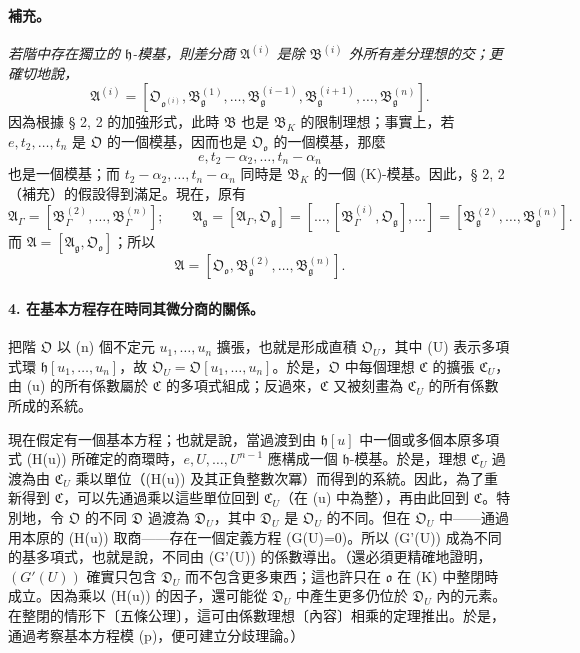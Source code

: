 \documentclass[11pt]{article}
\begin{document}
\paragraph{補充。}
\emph{若階中存在獨立的 \(\mathfrak h\)-模基，則差分商 \(\mathfrak A^{(i)}\) 是除 \(\mathfrak B^{(i)}\) 外所有差分理想的交；更確切地說，}
\[
\mathfrak A^{(i)}=
[\mathfrak O_{\mathfrak o^{(i)}},
\mathfrak B_{\mathfrak g}^{(1)},\ldots,
\mathfrak B_{\mathfrak g}^{(i-1)},
\mathfrak B_{\mathfrak g}^{(i+1)},\ldots,
\mathfrak B_{\mathfrak g}^{(n)}].
\]
因為根據 § 2, 2 的加強形式，此時 \(\mathfrak B\) 也是 \(\mathfrak B_K\) 的限制理想；事實上，若 \(e,t_2,\ldots,t_n\) 是 \(\mathfrak O\) 的一個模基，因而也是 \(\mathfrak O_{\mathfrak o}\) 的一個模基，那麼
\[
e,t_2-\alpha_2,\ldots,t_n-\alpha_n
\]
也是一個模基；而 \(t_2-\alpha_2,\ldots,t_n-\alpha_n\) 同時是 \(\mathfrak B_K\) 的一個 (K)-模基。因此，§ 2, 2（補充）的假設得到滿足。現在，原有
\[
\mathfrak A_\Gamma=[\mathfrak B_\Gamma^{(2)},\ldots,\mathfrak B_\Gamma^{(n)}];
\qquad
\mathfrak A_\mathfrak g=[\mathfrak A_\Gamma,\mathfrak O_\mathfrak g]
=[\ldots,[\mathfrak B_\Gamma^{(i)},\mathfrak O_\mathfrak g],\ldots]
=[\mathfrak B_\mathfrak g^{(2)},\ldots,\mathfrak B_\mathfrak g^{(n)}].
\]
而 \(\mathfrak A=[\mathfrak A_\mathfrak g,\mathfrak O_{\mathfrak o}]\)；所以
\[
\mathfrak A=[\mathfrak O_{\mathfrak o},\mathfrak B_\mathfrak g^{(2)},\ldots,\mathfrak B_\mathfrak g^{(n)}].
\]

\paragraph{4. 在基本方程存在時同其微分商的關係。}
把階 \(\mathfrak O\) 以 (n) 個不定元 \(u_1,\ldots,u_n\) 擴張，也就是形成直積 \(\mathfrak O_U\)，其中 (U) 表示多項式環 \(\mathfrak h[u_1,\ldots,u_n]\)，故 \(\mathfrak O_U=\mathfrak O[u_1,\ldots,u_n]\)。於是，\(\mathfrak O\) 中每個理想 \(\mathfrak C\) 的擴張 \(\mathfrak C_U\)，由 (u) 的所有係數屬於 \(\mathfrak C\) 的多項式組成；反過來，\(\mathfrak C\) 又被刻畫為 \(\mathfrak C_U\) 的所有係數所成的系統。

現在假定有一個基本方程；也就是說，當過渡到由 \(\mathfrak h[u]\) 中一個或多個本原多項式 (H(u)) 所確定的商環時，\(e,U,\ldots,U^{n-1}\) 應構成一個 \(\mathfrak h\)-模基。於是，理想 \(\mathfrak C_U\) 過渡為由 \(\mathfrak C_U\) 乘以單位（(H(u)) 及其正負整數次冪）而得到的系統。因此，為了重新得到 \(\mathfrak C\)，可以先通過乘以這些單位回到 \(\mathfrak C_U\)（在 (u) 中為整），再由此回到 \(\mathfrak C\)。特別地，令 \(\mathfrak O\) 的不同 \(\mathfrak D\) 過渡為 \(\mathfrak D_U\)，其中 \(\mathfrak D_U\) 是 \(\mathfrak O_U\) 的不同。但在 \(\mathfrak O_U\) 中——通過用本原的 (H(u)) 取商——存在一個定義方程 (G(U)=0)。所以 (G'(U)) 成為不同的基多項式，也就是說，不同由 (G'(U)) 的係數導出。（還必須更精確地證明，\((G'(U))\) 確實只包含 \(\mathfrak D_U\) 而不包含更多東西；這也許只在 \(\mathfrak o\) 在 (K) 中整閉時成立。因為乘以 (H(u)) 的因子，還可能從 \(\mathfrak D_U\) 中產生更多仍位於 \(\mathfrak D_U\) 內的元素。在整閉的情形下〔五條公理〕，這可由係數理想〔內容〕相乘的定理推出。於是，通過考察基本方程模 (p)，便可建立分歧理論。）
\end{document}
